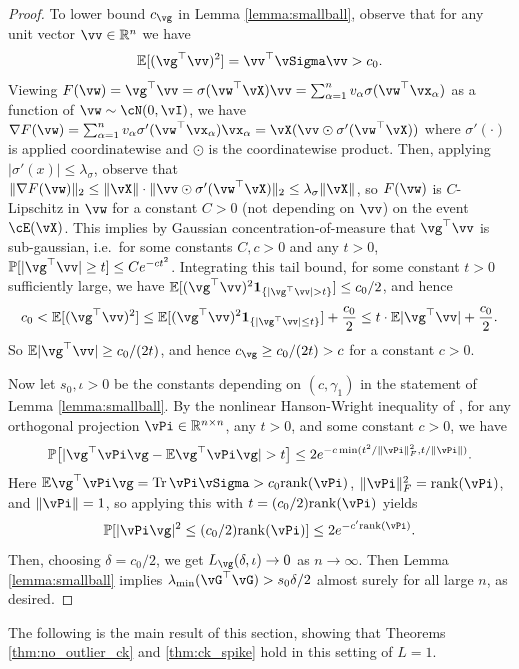 \begin{proof}
To lower bound $c_{\vg}$ in Lemma \ref{lemma:smallball}, observe that
for any unit vector $\vv \in \R^n$ we have
\[\E[(\vg^\top \vv)^2]=\vv^\top \vSigma\vv>c_0.\]
Viewing $F(\vw)=\vg^\top \vv=\sigma(\vw^\top \vX)\vv=\sum_{\alpha=1}^n v_\alpha
\sigma(\vw^\top \vx_\alpha)$ as a function of $\vw  \sim \cN(0,\vI)$, we have
$\nabla F(\vw)=\sum_{\alpha=1}^n v_\alpha \sigma'(\vw^\top \vx_\alpha)
\vx_\alpha=\vX(\vv \odot \sigma'(\vw^\top \vX))$ where
$\sigma'(\cdot)$ is applied coordinatewise and $\odot$ is the coordinatewise
product. Then, applying $|\sigma'(x)| \leq \lambda_\sigma$, observe that
$\|\nabla F(\vw)\|_2 \leq \|\vX\| \cdot \|\vv \odot \sigma'(\vw^\top \vX)\|_2
\leq \lambda_\sigma \|\vX\|$, so $F(\vw)$ is $C$-Lipschitz in $\vw$
for a constant $C>0$ (not depending on $\vv$) on the event $\cE(\vX)$.
This implies by Gaussian
concentration-of-measure that $\vg^\top \vv$ is sub-gaussian,
i.e.\ for some constants $C,c>0$ and any $t>0$,
$\P[|\vg^\top \vv| \geq t] \leq Ce^{-ct^2}$.
Integrating this tail bound, for some constant $t>0$ sufficiently large,
we have $\E[(\vg^\top \vv)^2\bI_{\{|\vg^\top \vv|>t\}}]
\leq c_0/2$, and hence
\[c_0<\E[(\vg^\top \vv)^2]
\leq \E[(\vg^\top \vv)^2\bI_{\{|\vg^\top \vv| \leq t\}}]+\frac{c_0}{2}
\leq t \cdot \E|\vg^\top \vv|+\frac{c_0}{2}.\]
So $\E|\vg^\top \vv| \geq c_0/(2t)$, and hence $c_{\vg} \geq c_0/(2t)>c$ for a
constant $c>0$.

Now let $s_0,\iota>0$ be the constants depending on $(c,\gamma_1)$ in the
statement of Lemma \ref{lemma:smallball}.
By the nonlinear Hanson-Wright inequality of
\cite[Eq.\ (3.3)]{wang2021deformed}, for any orthogonal projection $\vPi \in
\R^{n \times n}$, any $t>0$, and some constant $c>0$, we have
\[\P\big[|\vg^\top \vPi \vg-\E\vg^\top \vPi \vg|>t\big] \leq
2e^{-c\min(t^2/\|\vPi\|_F^2,t/\|\vPi\|)}.\]
Here $\E \vg^\top \vPi \vg=\Tr \vPi\vSigma>c_0\rank{\vPi}$,
$\|\vPi\|_F^2=\rank{\vPi}$, and $\|\vPi\|=1$,
so applying this with $t=(c_0/2)\rank{\vPi}$ yields
\[\P[|\vPi\vg|^2 \leq (c_0/2)\rank{\vPi}] \leq 2e^{-c'\rank{\vPi}}.\]
Then, choosing $\delta=c_0/2$, we get $L_{\vg}(\delta,\iota) \to 0$ as $n \to
\infty$. Then Lemma \ref{lemma:smallball} implies $\lambda_{\min}(\vG^\top
\vG)>s_0\delta/2$ almost surely for all large $n$, as desired.
\end{proof}

The following is the main result of this section, showing that Theorems
\ref{thm:no_outlier_ck} and \ref{thm:ck_spike} hold in this setting of $L=1$.

